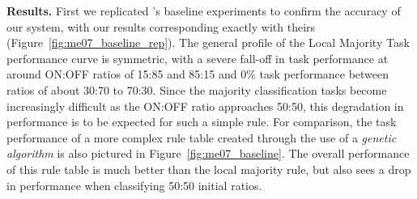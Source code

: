\documentclass[a4paper,11pt]{article}
\begin{document}
\medskip

\noindent \textbf{Results.} First we replicated \citeauthor{me07}'s baseline experiments to confirm the accuracy of our system, with our results corresponding exactly with theirs (Figure~\ref{fig:me07_baseline_rep}). The general profile of the Local Majority Task performance curve is symmetric, with a severe fall-off in task performance at around ON:OFF ratios of 15:85 and 85:15 and 0\% task performance between ratios of about 30:70 to 70:30. Since the majority classification tasks become increasingly difficult as the ON:OFF ratio approaches 50:50, this degradation in performance is to be expected for such a simple rule. For comparison, the task performance of a more complex rule table created through the use of a \textit{genetic algorithm} is also pictured in Figure~\ref{fig:me07_baseline}. The overall performance of this rule table is much better than the local majority rule, but also sees a drop in performance when classifying 50:50 initial ratios.
\end{document}
